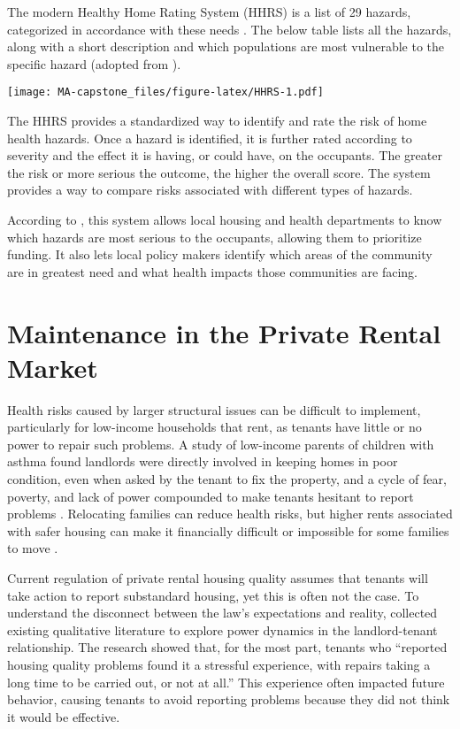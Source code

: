\documentclass[
]{book}
\begin{document}
The modern Healthy Home Rating System (HHRS) is a list of 29 hazards, categorized in accordance with these needs \citep[ 2]{HHRSover}. The below table lists all the hazards, along with a short description and which populations are most vulnerable to the specific hazard (adopted from \citep{HHRSlst}).

\texttt{[image: MA-capstone\_files/figure-latex/HHRS-1.pdf]}

The HHRS provides a standardized way to identify and rate the risk of home health hazards. Once a hazard is identified, it is further rated according to severity and the effect it is having, or could have, on the occupants. The greater the risk or more serious the outcome, the higher the overall score. The system provides a way to compare risks associated with different types of hazards.

According to \citet{HHRSover}, this system allows local housing and health departments to know which hazards are most serious to the occupants, allowing them to prioritize funding. It also lets local policy makers identify which areas of the community are in greatest need and what health impacts those communities are facing.

\hypertarget{maintenance-in-the-private-rental-market}{%
\section{Maintenance in the Private Rental Market}\label{maintenance-in-the-private-rental-market}}

Health risks caused by larger structural issues can be difficult to implement, particularly for low-income households that rent, as tenants have little or no power to repair such problems. A study of low-income parents of children with asthma found landlords were directly involved in keeping homes in poor condition, even when asked by the tenant to fix the property, and a cycle of fear, poverty, and lack of power compounded to make tenants hesitant to report problems \citep{grineski2010}. Relocating families can reduce health risks, but higher rents associated with safer housing can make it financially difficult or impossible for some families to move \citep{mclaine2006}.

Current regulation of private rental housing quality assumes that tenants will take action to report substandard housing, yet this is often not the case. To understand the disconnect between the law's expectations and reality, \citet{chisholm2018} collected existing qualitative literature to explore power dynamics in the landlord-tenant relationship. The research showed that, for the most part, tenants who ``reported housing quality problems found it a stressful experience, with repairs taking a long time to be carried out, or not at all.'' This experience often impacted future behavior, causing tenants to avoid reporting problems because they did not think it would be effective.
\end{document}
